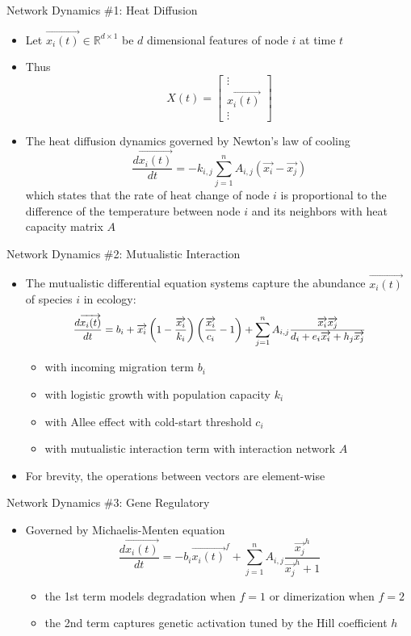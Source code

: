 \documentclass{beamer}
\begin{document}
\begin{frame}{Network Dynamics \#1: Heat Diffusion}
\begin{itemize}
\item Let $\overrightarrow{x_i(t)}\in\mathbb{R}^{d\times1}$ be $d$ dimensional features of node $i$ at time $t$
\item Thus\[
X(t)=\begin{bmatrix}\vdots\\\overrightarrow{x_i(t)}\\\vdots\end{bmatrix}
\]
\item The heat diffusion dynamics governed by Newton's law of cooling\[
\frac{d\overrightarrow{x_i(t)}}{dt}=-k_{i,j}\sum_{j=1}^nA_{i,j}(\overrightarrow{x_i}-\overrightarrow{x_j})
\]which states that the rate of heat change of node $i$ is proportional to the difference of the temperature between node $i$ and its neighbors with heat capacity matrix $A$
\end{itemize}
\end{frame}

\begin{frame}{Network Dynamics \#2: Mutualistic Interaction}
\begin{itemize}
\item The mutualistic differential equation systems capture the abundance $\overrightarrow{x_i(t)}$ of species $i$ in ecology:\[
\scalebox{0.92}{$\displaystyle \frac{d\overrightarrow{x_i(t)}}{dt}=b_i+\overrightarrow{x_i}\left(1-\frac{\overrightarrow{x_i}}{k_i}\right)\left(\frac{\overrightarrow{x_i}}{c_i}-1\right)+\sum_{j=1}^nA_{i,j}\frac{\overrightarrow{x_i}\overrightarrow{x_j}}{d_i+e_i\overrightarrow{x_i}+h_j\overrightarrow{x_j}}$}
\]
\begin{itemize}
\item with incoming migration term $b_i$
\item with logistic growth with population capacity $k_i$
\item with Allee effect with cold-start threshold $c_i$
\item with mutualistic interaction term with interaction network $A$
\end{itemize}
\item For brevity, the operations between vectors are element-wise
\end{itemize}
\end{frame}

\begin{frame}{Network Dynamics \#3: Gene Regulatory}
\begin{itemize}
\item Governed by Michaelis-Menten equation\[
\frac{d\overrightarrow{x_i(t)}}{dt}=-b_i\overrightarrow{x_i(t)}^f+\sum_{j=1}^nA_{i,j}\frac{\overrightarrow{x_j}^h}{\overrightarrow{x_j}^h+1}
\]
\begin{itemize}
\item the 1st term models degradation when $f=1$ or dimerization when $f=2$
\item the 2nd term captures genetic activation tuned by the Hill coefficient $h$
\end{itemize}
\end{itemize}
\end{frame}
\end{document}
